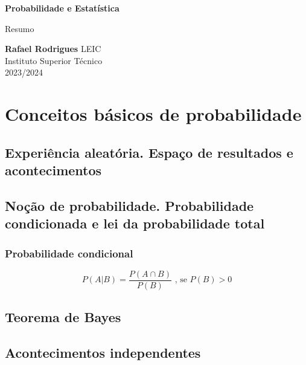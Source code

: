 \documentclass[11pt, a4paper]{article}
\begin{document}
\begin{titlepage}
    \begin{center}
        \vspace*{1cm}

        \textbf{\LARGE Probabilidade e Estatística}
        \vspace{0.5cm}

        \Large Resumo
        \vspace{1.5cm}

        \textbf{Rafael Rodrigues}
        \vfill
        LEIC \\
        Instituto Superior Técnico \\
        2023/2024
    \end{center}
\end{titlepage}

\tableofcontents

\newpage
\section{Conceitos básicos de probabilidade}


\subsection{Experiência aleatória. Espaço de resultados e acontecimentos}


\subsection{Noção de probabilidade. Probabilidade condicionada e lei da probabilidade total}

\subsubsection*{Probabilidade condicional}

\begin{equation*}
    P(A|B) = \frac{P(A \cap B)}{P(B)} \text{ , se } P(B) > 0
\end{equation*}


\subsection{Teorema de Bayes}


\subsection{Acontecimentos independentes}
\end{document}
